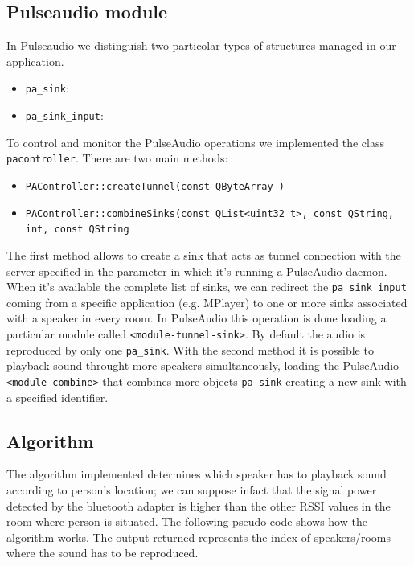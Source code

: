 \documentclass[conference]{./IEEEtran}
\begin{document}
\subsection{Pulseaudio module}
In Pulseaudio we distinguish two particolar types of structures managed in our application.
\begin{itemize}
\item \texttt{pa\_sink}: 
\item \texttt{pa\_sink\_input}:
\end{itemize}
To control and monitor the PulseAudio operations we implemented the class \texttt{pacontroller}. There are two main methods:
\begin{itemize}
\item \texttt{PAController::createTunnel(const QByteArray )}
\item \texttt{PAController::combineSinks(const QList<uint32\_t>, const QString, int, const QString}
\end{itemize} 
The first method allows to create a sink that acts as tunnel connection with the server specified in the parameter in which it's running a PulseAudio daemon. When it's available the complete list of sinks, we can redirect the \texttt{pa\_sink\_input} coming from a specific application (e.g. MPlayer) to one or more sinks associated with a speaker in every room. In PulseAudio this operation is done loading a particular module called \texttt{<module-tunnel-sink>}. 
By default the audio is reproduced by only one \texttt{pa\_sink}. With the second method it is possible to playback sound throught more speakers simultaneously, loading the PulseAudio \texttt{<module-combine>} that combines more objects \texttt{pa\_sink} creating a new sink with a specified identifier.  


\subsection{Algorithm}
The algorithm implemented determines which speaker has to playback sound according to person's location; we can suppose infact that the signal power detected by the bluetooth adapter is higher than the other RSSI values in the room where person is situated. The following pseudo-code shows how the algorithm works. The output returned represents the index of speakers/rooms where the sound has to be reproduced.
\end{document}
